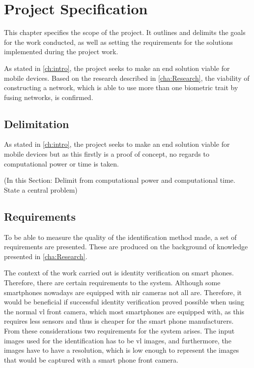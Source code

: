 \chapter{Project Specification}\glsresetall
This chapter specifies the scope of the project. It outlines and delimits the goals for the work conducted, as well as setting the requirements for the solutions implemented during the project work. 


As stated in \autoref{ch:intro}, the project seeks to make an end solution viable for mobile devices. Based on the research described in \autoref{cha:Research}, the viability of constructing a network, which is able to use more than one biometric trait by fusing networks, is confirmed.

\section{Delimitation}\label{sec:deliproject}
As stated in \autoref{ch:intro}, the project seeks to make an end solution viable for mobile devices but as this firstly is a proof of concept, no regards to computational power or time is taken.



(In this Section: Delimit from computational power and computational time. State a central problem)   


\section{Requirements}\label{ch:req}
To be able to measure the quality of the identification method made, a set of requirements are presented. These are produced on the background of knowledge presented in \autoref{cha:Research}.

The context of the work carried out is identity verification on smart phones. Therefore, there are certain requirements to the system. Although some smartphones nowadays are equipped with \gls{nir} cameras not all are. Therefore, it would be beneficial if successful identity verification proved possible when using the normal \gls{vl} front camera, which most smartphones are equipped with, as this requires less sensors and thus is cheaper for the smart phone manufacturers. From these considerations two requirements for the system arises. The input images used for the identification has to be \gls{vl} images, and furthermore, the images have to have a resolution, which is low enough to represent the images that would be captured with a smart phone front camera.

